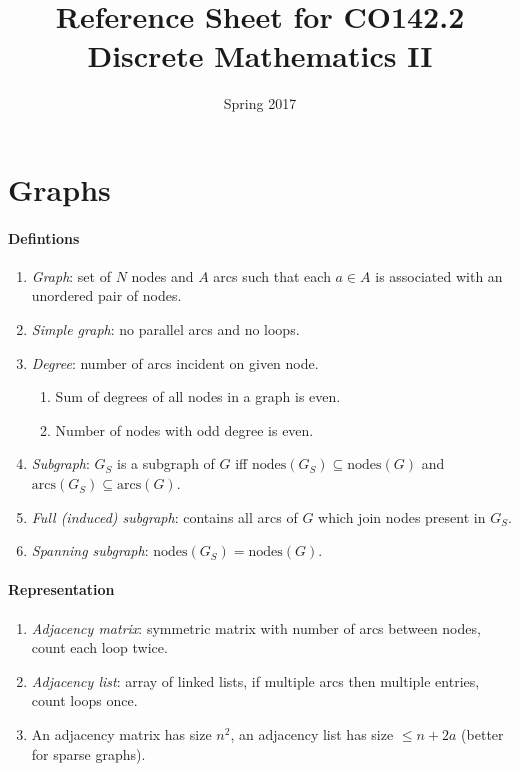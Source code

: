 \documentclass[twocolumn,english]{article}
\begin{document}
\title{Reference Sheet for CO142.2 Discrete Mathematics II}


\date{Spring 2017}

\maketitle

\section{Graphs}


\paragraph{Defintions}
\begin{enumerate}
\item \emph{Graph}: set of $N$ nodes and $A$ arcs such that each $a\in A$
is associated with an unordered pair of nodes.
\item \emph{Simple graph}: no parallel arcs and no loops.
\item \emph{Degree}: number of arcs incident on given node.

\begin{enumerate}
\item Sum of degrees of all nodes in a graph is even.
\item Number of nodes with odd degree is even.
\end{enumerate}
\item \emph{Subgraph}: $G_{S}$ is a subgraph of $G$ iff $\mbox{nodes}\left(G_{S}\right)\subseteq\mbox{nodes}\left(G\right)$
and $\mbox{arcs}\left(G_{S}\right)\subseteq\mbox{arcs}\left(G\right)$.
\item \emph{Full (induced) subgraph}: contains all arcs of $G$ which join
nodes present in $G_{S}$.
\item \emph{Spanning subgraph}: $\mbox{nodes}\left(G_{S}\right)=\mbox{nodes}\left(G\right)$.
\end{enumerate}

\paragraph{Representation}
\begin{enumerate}
\item \emph{Adjacency matrix}: symmetric matrix with number of arcs between
nodes, count each loop twice.
\item \emph{Adjacency list}: array of linked lists, if multiple arcs then
multiple entries, count loops once.
\item An adjacency matrix has size $n^{2}$, an adjacency list has size
$\leq n+2a$ (better for sparse graphs).
\end{enumerate}
\end{document}
